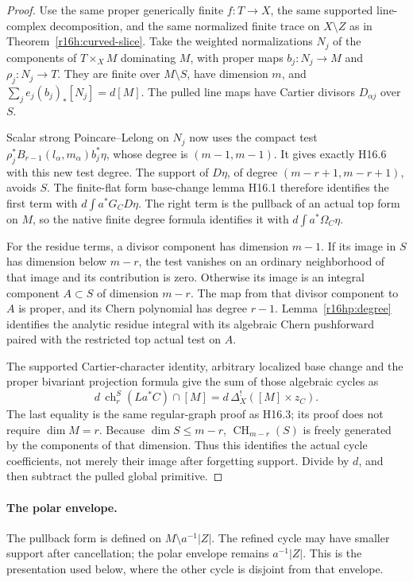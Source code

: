 \documentclass[11pt,a4paper]{article}
\theoremstyle{definition}
\theoremstyle{remark}
\numberwithin{equation}{section}
\begin{document}
\begin{proof}
Use the same proper generically finite $f:T\to X$, the same supported
line-complex decomposition, and the same normalized finite trace on
$X\setminus Z$ as in Theorem~\ref{r16h:curved-slice}. Take the weighted
normalizations $N_j$ of the components of $T\times_X M$ dominating
$M$, with proper maps $b_j:N_j\to M$ and $\rho_j:N_j\to T$.
They are finite over $M\setminus S$, have dimension $m$, and
$\sum_j e_j(b_j)_*[N_j]=d[M]$. The pulled line maps have Cartier
divisors $D_{\alpha j}$ over $S$.

Scalar strong Poincare--Lelong on $N_j$ now uses the compact test
$\rho_j^*B_{r-1}(l_\alpha,m_\alpha)b_j^*\eta$, whose degree is
$(m-1,m-1)$. It gives exactly H16.6 with this new test degree.
The support of $D\eta$, of degree $(m-r+1,m-r+1)$, avoids $S$.
The finite-flat form base-change lemma H16.1 therefore identifies
the first term with $d\int a^*G_C D\eta$. The right term is the
pullback of an actual top form on $M$, so the native finite degree
formula identifies it with $d\int a^*\Omega_C\eta$.

For the residue terms, a divisor component has dimension $m-1$.
If its image in $S$ has dimension below $m-r$, the test vanishes
on an ordinary neighborhood of that image and its contribution is
zero. Otherwise its image is an integral component $A\subset S$
of dimension $m-r$. The map from that divisor component to $A$
is proper, and its Chern polynomial has degree $r-1$.
Lemma~\ref{r16hp:degree} identifies the analytic residue integral
with its algebraic Chern pushforward paired with the restricted
top actual test on $A$.

The supported Cartier-character identity, arbitrary localized base
change and the proper bivariant projection formula give the sum
of those algebraic cycles as
\[
 d\,\operatorname{ch}_r^S(La^*C)\cap[M]
                  =d\,\Delta_X^!([M]\times z_C).
\]
The last equality is the same regular-graph proof as H16.3; its
proof does not require $\dim M=r$. Because $\dim S\leq m-r$,
$\operatorname{CH}_{m-r}(S)$ is freely generated by the components
of that dimension. Thus this identifies the actual cycle
coefficients, not merely their image after forgetting support.
Divide by $d$, and then subtract the pulled global primitive.
\end{proof}

\paragraph{The polar envelope.}
The pullback form is defined on $M\setminus a^{-1}|Z|$. The refined cycle may have smaller support after cancellation; the polar envelope remains $a^{-1}|Z|$. This is the presentation used below, where the other cycle is disjoint from that envelope.
\end{document}
